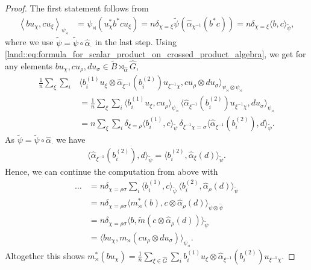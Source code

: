 \documentclass{amsart}
\theoremstyle{definition}
\theoremstyle{definition}
\begin{document}
\begin{proof}
    The first statement follows from
    \begin{align*}
        \left\langle b u_\chi, c u_\xi \right\rangle_{\psi_\rtimes} 
        &= \psi_\rtimes(u_\chi^\ast b^\ast c u_\xi)
        = n \delta_{\chi=\xi} \tilde{\psi}(\hat{\alpha}_{\chi^{-1}}(b^\ast c))
        = n \delta_{\chi=\xi} \langle b, c \rangle_{\tilde{\psi}},
    \end{align*}
    where we use $\tilde{\psi} = \tilde{\psi} \circ \hat{\alpha}_\cdot$ in the last step. Using \eqref{land::eq:formula_for_scalar_product_on_crossed_product_algebra}, we get for any elements $b u_\chi, c u_\rho, d u_\sigma \in \tilde{B} \rtimes_{\hat{\alpha}} \hat{G}$,
    \begin{align*}
        \frac{1}{n} \sum_\xi \sum_i& \langle b_i^{(1)} u_\xi \otimes \hat{\alpha}_{\xi^{-1}}(b_i^{(2)}) u_{\xi^{-1} \chi}, c u_\rho \otimes d u_\sigma \rangle_{\psi_\rtimes \otimes \psi_\rtimes} \\
        &= \frac{1}{n} \sum_\xi \sum_i \langle b_i^{(1)} u_\xi, c u_\rho \rangle_{\psi_\rtimes} \, \langle \hat{\alpha}_{\xi^{-1}}(b_i^{(2)}) u_{\xi^{-1} \chi}, d u_\sigma \rangle_{\psi_\rtimes} \\
        &= n \sum_\xi \sum_i \delta_{\xi=\rho} \langle b_i^{(1)}, c \rangle_{\tilde{\psi}} \, \delta_{\xi^{-1}\chi = \sigma} \langle \hat{\alpha}_{\xi^{-1}}(b_i^{(2)}), d \rangle_{\tilde{\psi}}.
    \end{align*}
    As $\tilde{\psi} = \tilde{\psi} \circ \hat{\alpha}_\cdot$ we have
    \begin{align*}
        \langle \hat{\alpha}_{\xi^{-1}}(b_i^{(2)}), d \rangle_{\tilde{\psi}} = \langle b_i^{(2)}, \hat{\alpha}_\xi(d) \rangle_{\tilde{\psi}}.
    \end{align*}
    Hence, we can continue the computation from above with
    \begin{align*}
        \dots 
        &= n \delta_{\chi=\rho \sigma} \sum_i \langle b_i^{(1)}, c \rangle_{\tilde{\psi}} \,\langle b_i^{(2)}, \hat{\alpha}_\rho(d) \rangle_{\tilde{\psi}} \\
        &= n \delta_{\chi=\rho \sigma} \langle m_\rtimes^\ast(b), c \otimes \hat{\alpha}_\rho(d) \rangle_{\tilde{\psi} \otimes \tilde{\psi}} \\
        &= n \delta_{\chi=\rho \sigma} \langle b, \tilde{m}(c \otimes \hat{\alpha}_\rho(d)) \rangle_{\tilde{\psi}} \\
        &= \langle b u_\chi, m_\rtimes(c u_\rho \otimes d u_\sigma) \rangle_{\psi_\rtimes}.
    \end{align*}
    Altogether this shows $m^\ast_\rtimes(b u_\chi) = \frac{1}{n} \sum_{\xi \in \hat{G}} \sum_i b_i^{(1)} u_\xi \otimes \hat{\alpha}_{\xi^{-1}}(b_i^{(2)}) u_{\xi^{-1} \chi}$.


\end{proof}
\end{document}
